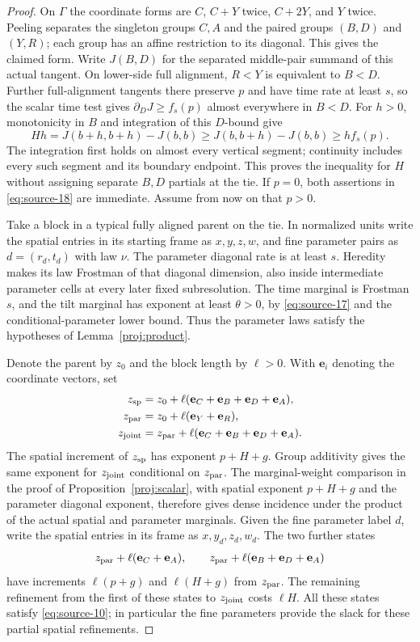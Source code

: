 \begin{proof}
On $\Gamma$ the coordinate forms are $C$, $C+Y$ twice,
$C+2Y$, and $Y$ twice. Peeling separates the singleton groups
$C,A$ and the paired groups $(B,D)$ and $(Y,R)$; each group
has an affine restriction to its diagonal. This gives the
claimed form. Write $J(B,D)$ for the separated middle-pair summand
of this actual tangent. On lower-side full alignment, $R<Y$ is
equivalent to $B<D$. Further full-alignment tangents there preserve
$p$ and have time rate at least $s$, so the scalar time test gives
$\partial_DJ\ge f_s(p)$ almost everywhere in $B<D$. For $h>0$,
monotonicity in $B$ and integration of this $D$-bound give
\[
 Hh=J(b+h,b+h)-J(b,b)
 \ge J(b,b+h)-J(b,b)\ge h f_s(p).
\]
The integration first holds on almost every vertical segment;
continuity includes every such segment and its boundary endpoint.
This proves the inequality for $H$ without assigning separate
$B,D$ partials at the tie. If $p=0$,
both assertions in \eqref{eq:source-18} are immediate. Assume
from now on that $p>0$.

Take a block in a typical fully aligned parent on the tie. In normalized units
write the spatial entries in its starting frame as $x,y,z,w$,
and fine parameter pairs as $d=(r_d,t_d)$ with law $\nu$.
The parameter diagonal rate is at least $s$. Heredity makes
its law Frostman of that diagonal dimension, also inside
intermediate parameter cells at every later fixed
subresolution. The time marginal is Frostman $s$, and the
tilt marginal has exponent at least $\theta>0$, by
\eqref{eq:source-17} and the conditional-parameter lower
bound. Thus the parameter laws satisfy the hypotheses of
Lemma~\ref{proj:product}.

Denote the parent by $z_0$ and the block length by $\ell>0$.
With $\mathbf e_i$ denoting the coordinate vectors, set
\[
\begin{aligned}
 z_{\rm sp}&=z_0+\ell(\mathbf e_C+\mathbf e_B+\mathbf e_D+\mathbf e_A),\\
 z_{\rm par}&=z_0+\ell(\mathbf e_Y+\mathbf e_R),\\
 z_{\rm joint}&=z_{\rm par}
                  +\ell(\mathbf e_C+\mathbf e_B+\mathbf e_D+\mathbf e_A).
\end{aligned}
\]
The spatial increment of $z_{\rm sp}$ has exponent $p+H+g$.
Group additivity gives the same exponent for $z_{\rm joint}$
conditional on $z_{\rm par}$. The marginal-weight comparison in
the proof of Proposition~\ref{proj:scalar}, with spatial exponent
$p+H+g$ and the parameter diagonal exponent, therefore gives dense
incidence under the product of the actual spatial and parameter
marginals. Given the fine
parameter label $d$, write the spatial entries in its frame as
$x,y_d,z_d,w_d$. The two further states
\[
 z_{\rm par}+\ell(\mathbf e_C+\mathbf e_A),\qquad
 z_{\rm par}+\ell(\mathbf e_B+\mathbf e_D+\mathbf e_A)
\]
have increments $\ell(p+g)$ and $\ell(H+g)$ from $z_{\rm par}$.
The remaining refinement from the first of these states to
$z_{\rm joint}$ costs $\ell H$. All these states satisfy
\eqref{eq:source-10}; in particular the fine parameters provide
the slack for these partial spatial refinements.


\end{proof}
